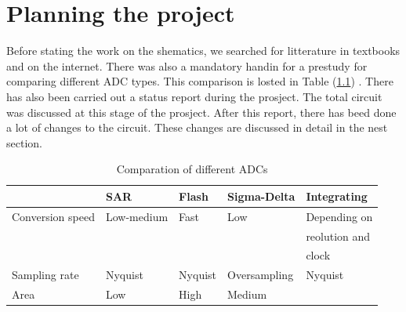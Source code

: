 \documentclass[english, 12pt, a4paper]{ifimaster}
\begin{document}
\chapter{Planning the project} 
Before stating the work on the shematics, we searched for litterature in textbooks and on the internet. There was also a mandatory handin for a prestudy for comparing different ADC types. This 
comparison is losted in Table (\ref{comp:adc}) \cite{forstudie}. There has also been carried out a status report during the prosject. The total circuit was discussed at this stage of the prosject.
After this report, there has beed done a lot of changes to the circuit. These changes are discussed in detail in the nest section. 

\begin{table}[!ht]
 \centering
 \begin{tabular}{|l|l|l|l|l|}
  \hline
                   & SAR        & Flash   & Sigma-Delta  & Integrating          \\ \hline
  Conversion speed & Low-medium & Fast    & Low          & Depending on 	\\
		   &	        &	  &		 & reolution and 	\\
		   &		&	  &		 & clock 		\\ \hline
  Sampling rate    & Nyquist    & Nyquist & Oversampling & Nyquist              \\ \hline
  Area             & Low        & High    & Medium       &                      \\ \hline
 \end{tabular}
 \caption{Comparation of different ADCs}
 \label{comp:adc}
\end{table}



\end{document}
